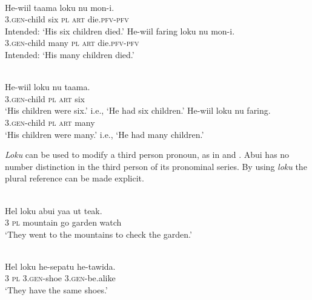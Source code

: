 \ea%
\label{ex:9:49}
 \\
\ea
\gll *He-wiil taama loku nu mon-i.\\
   \textsc{3.gen}-child six \textsc{pl} \textsc{art} die.\textsc{pfv}-\textsc{pfv} \\
\glt Intended: `His six children died.'
\ex
\gll *He-wiil faring loku nu mon-i.\\
 \textsc{3.gen}-child many \textsc{pl} \textsc{art} die.\textsc{pfv}-\textsc{pfv}   \\
\glt  Intended: `His many children died.'
\z
\z





\ea%
\label{ex:9:50}
 \\
\ea
\gll  He-wiil loku nu {taama.}\\
  \textsc{3.gen}-child \textsc{pl} \textsc{art} six  \\
\glt `His children were six.' i.e., `He had six children.'
\ex
\gll He-wiil loku nu faring. \\
 \textsc{3.gen}-child \textsc{pl} \textsc{art} many   \\
\glt  `His children were many.' i.e., `He had many children.'
\z
\z






\textit{Loku} can be used to modify a third person pronoun, as in  and . Abui has no number distinction in the third person of its pronominal series. By using \textit{loku} the plural reference can be made explicit.


\ea%
\label{ex:9:51}
 \\
\gll  Hel loku abui yaa ut {teak.}\\
  3 \textsc{pl}   mountain go garden watch  \\
\glt `They went to the mountains to check the garden.'
\z







\ea%
\label{ex:9:52}
 \\
\gll  Hel loku he-sepatu {he-tawida}. \\
  3 \textsc{pl}   \textsc{3.gen}-shoe \textsc{3.gen}-be.alike   \\
\glt `They have the same shoes.'
\z






